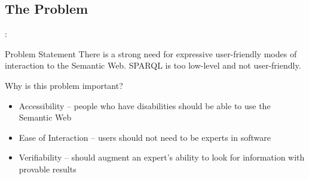 \documentclass[logoontitle,tabu,supertabular,aspectratio=43]{preney-uwindsor-beamer}
\begin{document}
    \subsection{The Problem}
    \begin{frame}{\insertsection: \insertsubsection}

        \begin{block}{Problem Statement}
            There is a strong need for expressive user-friendly modes of interaction to the Semantic Web.  SPARQL is too low-level and not user-friendly.
        \end{block}

        Why is this problem important?
        \begin{itemize}
            \item Accessibility -- people who have disabilities should be able to use the Semantic Web
            \item Ease of Interaction -- users should not need to be experts in software

            \item Verifiability -- should augment an expert's ability to look for information with provable results
        \end{itemize}

    \end{frame}


\end{document}
